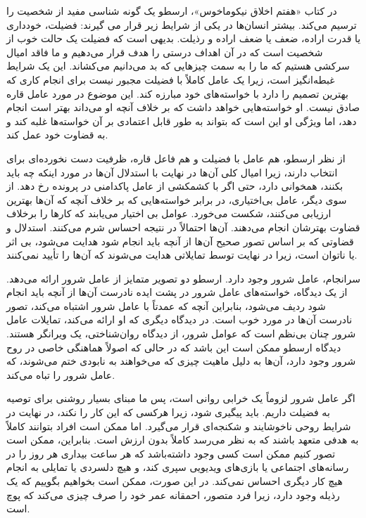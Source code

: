 در کتاب «هفتم اخلاق نیکوماخوس»، ارسطو یک گونه شناسی مفید از شخصیت را ترسیم می‌کند.
بیشتر انسان‌ها در یکی از شرایط زیر قرار می گیرند: فضیلت، خودداری یا قدرت اراده، ضعف یا ضعف اراده و رذیلت.
بدیهی است که فضیلت یک حالت خوب از شخصیت است که در آن اهداف درستی را هدف قرار می‌دهیم و ما فاقد امیال سرکشی هستیم که ما را به سمت چیزهایی که بد می‌دانیم می‌کشاند.
این یک شرایط غبطه‌انگیز است، زیرا یک عامل کاملاً با فضیلت مجبور نیست برای انجام کاری که بهترین تصمیم را دارد با خواسته‌های خود مبارزه کند.
این موضوع در مورد عامل قاره صادق نیست.
او خواسته‌هایی خواهد داشت که بر خلاف آنچه او می‌داند بهتر است انجام دهد، اما ویژگی او این است که بتواند به طور قابل اعتمادی بر آن خواسته‌ها غلبه کند و به قضاوت خود عمل کند.

از نظر ارسطو، هم عامل با فضیلت و هم فاعل قاره، ظرفیت دست نخورده‌ای برای انتخاب دارند، زیرا امیال کلی آن‌ها در نهایت با استدلال آن‌ها در مورد اینکه چه باید بکنند، همخوانی دارد، حتی اگر با کشمکشی از عامل پاکدامنی در پرونده رخ دهد.
از سوی دیگر، عامل بی‌اختیاری، در برابر خواسته‌هایی که بر خلاف آنچه که آن‌ها بهترین ارزیابی می‌کنند، شکست می‌خورد.
عوامل بی اختیار می‌یابند که کارها را برخلاف قضاوت بهترشان انجام می‌دهند.
آن‌ها احتمالاً در نتیجه احساس شرم می‌کنند.
استدلال و قضاوتی که بر اساس تصور صحیح آن‌ها از آنچه باید انجام شود هدایت می‌شود، بی اثر یا ناتوان است، زیرا در نهایت توسط تمایلاتی هدایت می‌شوند که آن‌ها را تأیید نمی‌کنند.

سرانجام، عامل شرور وجود دارد.
ارسطو دو تصویر متمایز از عامل شرور ارائه می‌دهد.
از یک دیدگاه، خواسته‌های عامل شرور در پشت ایده نادرست آن‌ها از آنچه باید انجام شود ردیف می‌شود، بنابراین آنچه که عمدتاً با عامل شرور اشتباه می‌کند، تصور نادرست آن‌ها در مورد خوب است.
در دیدگاه دیگری که او ارائه می‌کند، تمایلات عامل شرور چنان بی‌نظم است که عوامل شرور، از دیدگاه روان‌شناختی، یک ویرانگر هستند.
دیدگاه ارسطو ممکن است این باشد که در حالی که اصولاً هماهنگی خاصی در روح شرور وجود دارد، آن‌ها به دلیل ماهیت چیزی که می‌خواهند به نابودی ختم می‌شوند، که عامل شرور را تباه می‌کند.

اگر عامل شرور لزوماً یک خرابی روانی است، پس ما مبنای بسیار روشنی برای توصیه به فضیلت داریم.
باید پیگیری شود، زیرا هرکسی که این کار را نکند، در نهایت در شرایط روحی ناخوشایند و شکنجه‌ای قرار می‌گیرد.
اما ممکن است افراد بتوانند کاملاً به هدفی متعهد باشند که به نظر می‌رسد کاملاً بدون ارزش است.
بنابراین، ممکن است تصور کنیم ممکن است کسی وجود داشته‌باشد که هر ساعت بیداری هر روز را در رسانه‌های اجتماعی یا بازی‌های ویدیویی سپری کند، و هیچ دلسردی یا تمایلی به انجام هیچ کار دیگری احساس نمی‌کند.
در این صورت، ممکن است بخواهیم بگوییم که یک رذیله وجود دارد، زیرا فرد متصور، احمقانه عمر خود را صرف چیزی می‌کند که پوچ است.

